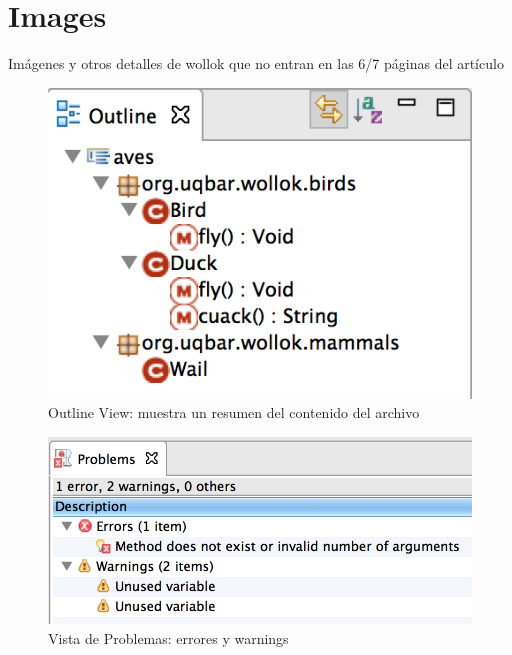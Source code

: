 \documentclass[preprint,10pt]{sigplanconf}
\begin{document}
% 
% 

% 

{
\small


}

\newpage
\appendix
\section{Images}
Imágenes y otros detalles de wollok que no entran en las 6/7 páginas del artículo

	\begin{figure}[p]
	    \centering
		\includegraphics[scale=0.5]{images/wollok-paper-outline.png}
	    \caption{Outline View: muestra un resumen del contenido del archivo}
	    \label{fig:outline.png}
	\end{figure}
	
	\begin{figure}[p]
	    \centering
		\includegraphics[scale=0.5]{images/wollok-paper-check-problemsview.png}
	    \caption{Vista de Problemas: errores y warnings}
	    \label{fig:problemsview.png}
	\end{figure}
	
\end{document}
